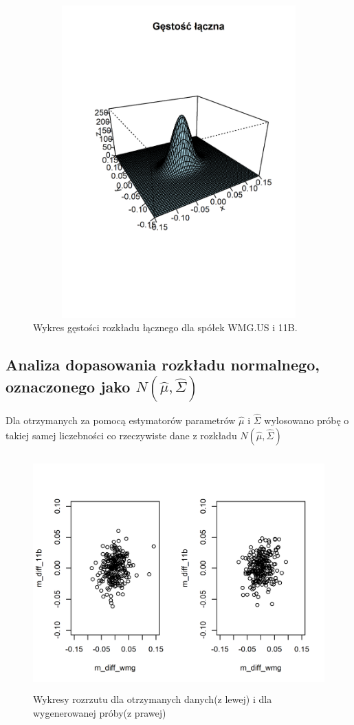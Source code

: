 \documentclass[a4paper,11pt]{article}
\begin{document}
\begin{figure}[h]
\centering
\includegraphics[width=12cm, height=12cm]{img/diff_gestosc_laczona_detailed.png}
\caption{Wykres gęstości rozkładu łącznego dla spółek WMG.US i 11B.}
\label{fig:densityPlot}
\end{figure}
\newpage

\subsection{Analiza dopasowania rozkładu normalnego, oznaczonego jako \( N(\hat{\mu}, \hat{\Sigma}) \)}

Dla otrzymanych za pomocą estymatorów parametrów \( \hat{\mu} \) i \( \hat{\Sigma} \) wylosowano próbę o takiej samej liczebności co rzeczywiste dane z rozkładu \( N(\hat{\mu}, \hat{\Sigma}) \)

\begin{figure}[h]
\centering
\includegraphics[width=12cm, height=9cm]{img/diff_wykresy_rozrzutu.png}
\caption{Wykresy rozrzutu dla otrzymanych danych(z lewej) i dla wygenerowanej próby(z prawej)}
\end{figure}
\end{document}
